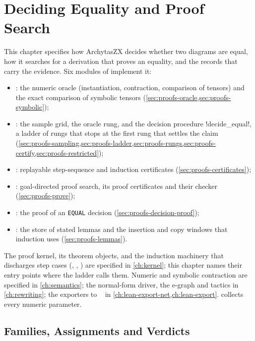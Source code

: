 \chapter{Deciding Equality and Proof Search}\label{ch:proofs}

This chapter specifies how ArchytasZX decides whether two diagrams are equal, how it searches for a derivation that proves an equality, and the records that carry the evidence. Six modules of  implement it:
\begin{itemize}
\item {}: the numeric oracle (instantiation, contraction, comparison of tensors) and the exact comparison of symbolic tensors (\cref{sec:proofs-oracle,sec:proofs-symbolic});
\item {}: the sample grid, the oracle rung, and the decision procedure \py!decide_equal!, a ladder of rungs that stops at the first rung that settles the claim (\cref{sec:proofs-sampling,sec:proofs-ladder,sec:proofs-rungs,sec:proofs-certify,sec:proofs-restricted});
\item {}: replayable step-sequence and induction certificates (\cref{sec:proofs-certificates});
\item {}: goal-directed proof search, its proof certificates and their checker (\cref{sec:proofs-prove});
\item {}: the proof of an \texttt{EQUAL} decision (\cref{sec:proofs-decision-proof});
\item {}: the store of stated lemmas and the insertion and copy windows that induction uses (\cref{sec:proofs-lemmas}).
\end{itemize}
The proof kernel, its theorem objects, and the induction machinery that discharges step cases (, , ) are specified in \cref{ch:kernel}; this chapter names their entry points where the ladder calls them. Numeric and symbolic contraction are specified in \cref{ch:semantics}; the normal-form driver, the e-graph and tactics in \cref{ch:rewriting}; the exporters to ~\cite{demoura2021lean4} in \cref{ch:lean-export-net,ch:lean-export}.  collects every numeric parameter.

\section{Families, Assignments and Verdicts}\label{sec:proofs-overview}

